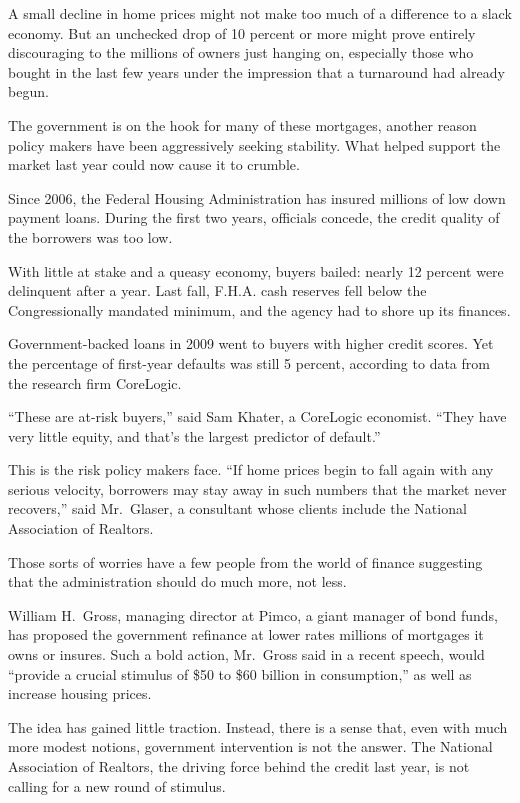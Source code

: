 ﻿\documentclass[12pt]{article}
\begin{document}
A small decline in home prices might not make too much of a difference to a slack economy. But an
unchecked drop of 10 percent or more might prove entirely discouraging to the millions of owners
just hanging on, especially those who bought in the last few years under the impression that a
turnaround had already begun.

The government is on the hook for many of these mortgages, another reason policy makers have been
aggressively seeking stability. What helped support the market last year could now cause it to
crumble.

Since 2006, the Federal Housing Administration has insured millions of low down payment loans.
During the first two years, officials concede, the credit quality of the borrowers was too low.

With little at stake and a queasy economy, buyers bailed: nearly 12 percent were delinquent after a
year. Last fall, F.H.A. cash reserves fell below the Congressionally mandated minimum, and the
agency had to shore up its finances.

Government-backed loans in 2009 went to buyers with higher credit scores. Yet the percentage of
first-year defaults was still 5 percent, according to data from the research firm CoreLogic.

``These are at-risk buyers,'' said Sam Khater, a CoreLogic economist. ``They have very little
equity, and that's the largest predictor of default.''

This is the risk policy makers face. ``If home prices begin to fall again with any serious velocity,
borrowers may stay away in such numbers that the market never recovers,'' said Mr.~Glaser, a
consultant whose clients include the National Association of Realtors.

Those sorts of worries have a few people from the world of finance suggesting that the
administration should do much more, not less.

William H.~Gross, managing director at Pimco, a giant manager of bond funds, has proposed the
government refinance at lower rates millions of mortgages it owns or insures. Such a bold action,
Mr.~Gross said in a recent speech, would ``provide a crucial stimulus of \$50 to \$60 billion in
consumption,'' as well as increase housing prices.

The idea has gained little traction. Instead, there is a sense that, even with much more modest
notions, government intervention is not the answer. The National Association of Realtors, the
driving force behind the credit last year, is not calling for a new round of stimulus.
\end{document}
